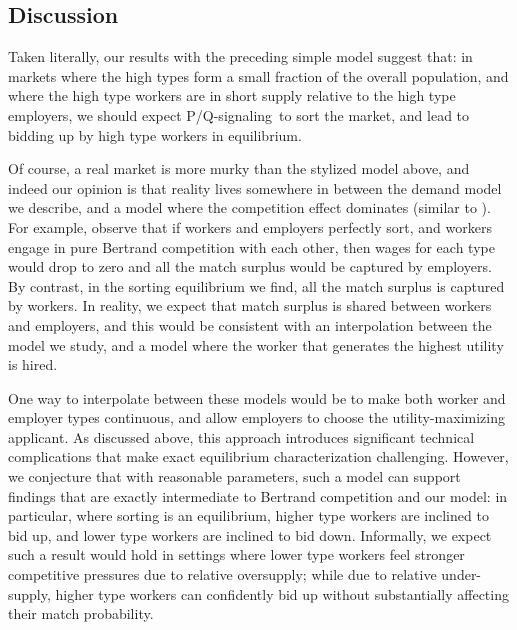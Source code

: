 \documentclass[prodmode,acmec]{ec-acmsmall}
\newcommand{\hottowel}{P/Q-signaling}
\begin{document}
\subsection{Discussion}

Taken literally, our results with the preceding simple model suggest that: in markets where the high types form a small fraction of the overall population, and where the high type workers are in short supply relative to the high type employers, we should expect \hottowel~to sort the market, and lead to bidding up by high type workers in equilibrium.

Of course, a real market is more murky than the stylized model above, and indeed our opinion is that reality lives somewhere in between the demand model we describe, and a model where the competition effect dominates (similar to \cite{tadelis2011information}).
For example, observe that if workers and employers perfectly sort, and workers engage in pure Bertrand competition with each other, then wages for each type would drop to zero and all the match surplus would be captured by employers.
By contrast, in the sorting equilibrium we find, all the match surplus is captured by workers.
In reality, we expect that match surplus is shared between workers and employers, and this would be consistent with an interpolation between the model we study, and a model where the worker that generates the highest utility is hired.

One way to interpolate between these models would be to make both worker and employer types continuous, and allow employers to choose the utility-maximizing applicant.
As discussed above, this approach introduces significant technical complications that make exact equilibrium characterization challenging.
However, we conjecture that with reasonable parameters, such a model can support findings that are exactly intermediate to Bertrand competition and our model:
in particular, where sorting is an equilibrium, higher type workers are inclined to bid up, and lower type workers are inclined to bid down.
Informally, we expect such a result would hold in settings where lower type workers feel stronger competitive pressures due to relative oversupply; while due to relative under-supply, higher type workers can confidently bid up without substantially affecting their match probability.

\end{document}
